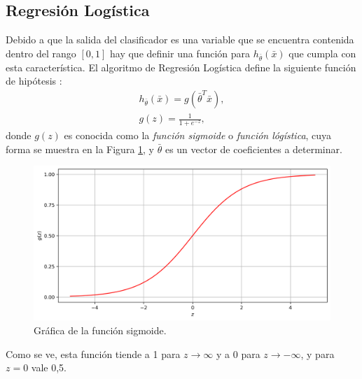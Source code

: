 \subsection{Regresión Logística}
Debido a que la salida del clasificador es una variable que se encuentra contenida dentro del rango $[0,1]$ hay que definir una función para $h_{\bar{\theta}}(\bar{x})$ que cumpla con esta característica. El algoritmo de Regresión Logística define la siguiente función de hipótesis \cite{bib:machinelearning}:
\begin{gather}
  h_{\bar{\theta}}(\bar{x})=g(\bar{\theta}^T \bar{x}),\\
  g(z)=\frac{1}{1+e^{-z}},\end{gather}
donde $g(z)$ es conocida como la \emph{función sigmoide} o \emph{función lógística}, cuya forma se muestra en la Figura \ref{fig:ml_sigmoid}, y $\bar{\theta}$ es un vector de coeficientes a determinar.
\begin{figure}[ht!]
  \centering
  \includegraphics[width=0.9\linewidth]{images/05-Machine Learning/ml_sigmoid.png}
  \caption{Gráfica de la función sigmoide.}
  \label{fig:ml_sigmoid}
\end{figure}
Como se ve, esta función tiende a 1 para $z\rightarrow \infty$ y a 0 para $z\rightarrow -\infty$, y para $z=0$ vale 0,5.

